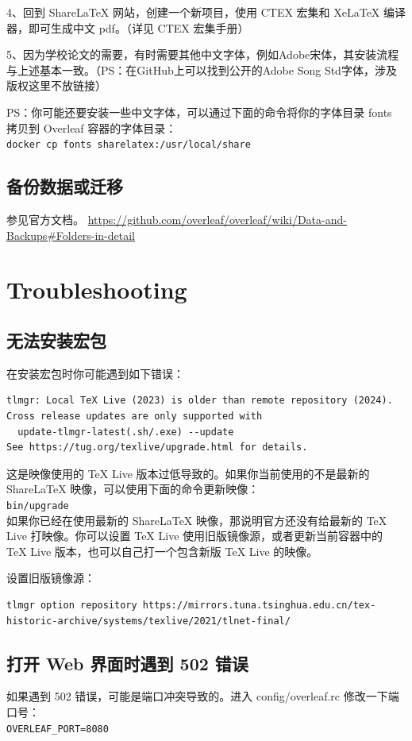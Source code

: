 4、回到 ShareLaTeX 网站，创建一个新项目，使用 CTEX 宏集和 XeLaTeX 编译器，即可生成中文 pdf。（详见 CTEX 宏集手册）

5、因为学校论文的需要，有时需要其他中文字体，例如Adobe宋体，其安装流程与上述基本一致。（PS：在GitHub上可以找到公开的Adobe Song Std字体，涉及版权这里不放链接）


PS：你可能还要安装一些中文字体，可以通过下面的命令将你的字体目录 fonts 拷贝到 Overleaf 容器的字体目录：\\
\verb|docker cp fonts sharelatex:/usr/local/share|



\subsection{备份数据或迁移}
参见官方文档。
\url{https://github.com/overleaf/overleaf/wiki/Data-and-Backups#Folders-in-detail}



\section{Troubleshooting}
\subsection{无法安装宏包}
在安装宏包时你可能遇到如下错误：
\begin{verbatim}
tlmgr: Local TeX Live (2023) is older than remote repository (2024).
Cross release updates are only supported with
  update-tlmgr-latest(.sh/.exe) --update
See https://tug.org/texlive/upgrade.html for details.
\end{verbatim}
这是映像使用的 TeX Live 版本过低导致的。如果你当前使用的不是最新的 ShareLaTeX 映像，可以使用下面的命令更新映像：\\
\verb|bin/upgrade|\\
如果你已经在使用最新的 ShareLaTeX 映像，那说明官方还没有给最新的 TeX Live 打映像。你可以设置 TeX Live 使用旧版镜像源，或者更新当前容器中的 TeX Live 版本，也可以自己打一个包含新版 TeX Live 的映像。

设置旧版镜像源：
{\tiny
\begin{verbatim}
tlmgr option repository https://mirrors.tuna.tsinghua.edu.cn/tex-historic-archive/systems/texlive/2021/tlnet-final/
\end{verbatim}
}



\subsection{打开 Web 界面时遇到 502 错误}
如果遇到 502 错误，可能是端口冲突导致的。进入 config/overleaf.rc 修改一下端口号：\\
\verb|OVERLEAF_PORT=8080|



